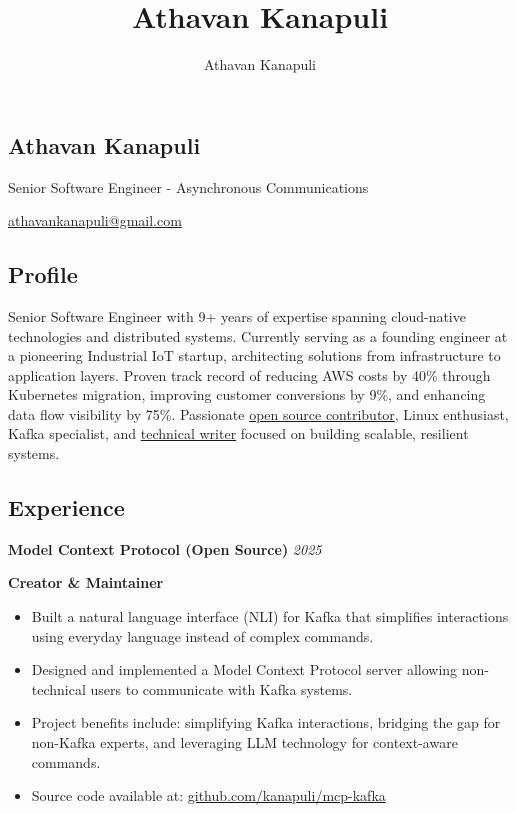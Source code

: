 \documentclass[11pt, oneside]{article}
\title{Athavan Kanapuli}
\author{Athavan Kanapuli}
\begin{document}
\begin{center}
\section*{Athavan Kanapuli}
Senior Software Engineer - Asynchronous Communications

\href{athavankanapuli@gmail.com}{athavankanapuli@gmail.com}
\end{center}

\subsection*{Profile}

Senior Software Engineer with 9+ years of expertise spanning cloud-native technologies and distributed systems. Currently serving as a founding engineer at a pioneering Industrial IoT startup, architecting solutions from infrastructure to application layers. Proven track record of reducing AWS costs by 40\% through Kubernetes migration, improving customer conversions by 9\%, and enhancing data flow visibility by 75\%. Passionate \href{https://github.com/kanapuli}{open source contributor}, Linux enthusiast, Kafka specialist, and \href{https://medium.com/@athavankanapuli}{technical writer} focused on building scalable, resilient systems.

\medskip
\subsection*{Experience}

\textbf{Model Context Protocol (Open Source)}
\hfill
\textit{2025}

\textbf{Creator \& Maintainer}

\begin{itemize}
  \item Built a natural language interface (NLI) for Kafka that simplifies interactions using everyday language instead of complex commands.
  \item Designed and implemented a Model Context Protocol server allowing non-technical users to communicate with Kafka systems.
  \item Project benefits include: simplifying Kafka interactions, bridging the gap for non-Kafka experts, and leveraging LLM technology for context-aware commands.
  \item Source code available at: \href{https://github.com/kanapuli/mcp-kafka}{github.com/kanapuli/mcp-kafka}
\end{itemize}
\end{document}
